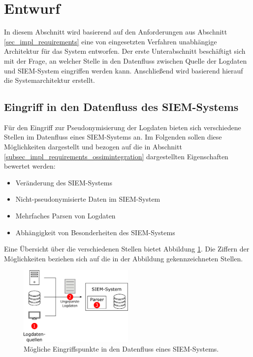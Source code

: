 \section{Entwurf}

\label{sec_impl_architecture}

In diesem Abschnitt wird basierend auf den Anforderungen aus Abschnitt \ref{sec_impl_requirements} eine von eingesetzten Verfahren unabhängige Architektur für das System entworfen. Der erste Unterabschnitt beschäftigt sich mit der Frage, an welcher Stelle in den Datenfluss zwischen Quelle der Logdaten und SIEM-System eingriffen werden kann. Anschließend wird basierend hierauf die Systemarchitektur erstellt.

\subsection{Eingriff in den Datenfluss des SIEM-Systems}

\label{sec_over_dataflow_siem}

Für den Eingriff zur Pseudonymisierung der Logdaten bieten sich verschiedene Stellen im Datenfluss eines SIEM-Systems an. Im Folgenden sollen diese Möglichkeiten dargestellt und bezogen auf die in Abschnitt \ref{subsec_impl_requirements_ossimintegration} dargestellten Eigenschaften bewertet werden:
\begin{itemize}
  \item Veränderung des SIEM-Systems
  \item Nicht-pseudonymisierte Daten im SIEM-System
  \item Mehrfaches Parsen von Logdaten
  \item Abhängigkeit von Besonderheiten des SIEM-Systems
\end{itemize}
Eine Übersicht über die verschiedenen Stellen bietet Abbildung \ref{fig:siem_data_access_point}. Die Ziffern der Möglichkeiten beziehen sich auf die in der Abbildung gekennzeichneten Stellen.

\begin{figure}[]
    \centering
        \includegraphics[width=0.5\textwidth]{dia/siem_data_access_point.pdf}
    \caption{Mögliche Eingriffspunkte in den Datenfluss eines SIEM-Systems.}
    \label{fig:siem_data_access_point}
\end{figure}

